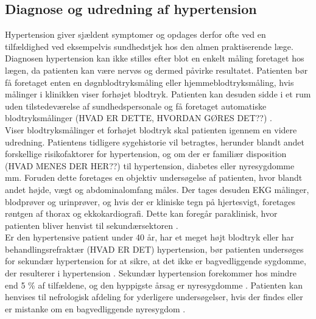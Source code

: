 \subsection{Diagnose og udredning af hypertension}
Hypertension giver sjældent symptomer og opdages derfor ofte ved en tilfældighed ved eksempelvis sundhedstjek hos den almen praktiserende læge. Diagnosen hypertension kan ikke stilles efter blot en enkelt måling foretaget hos lægen, da patienten kan være nervøs og dermed påvirke resultatet. Patienten bør få foretaget enten en døgnblodtryksmåling eller hjemmeblodtryksmåling, hvis målinger i klinikken viser forhøjet blodtryk. Patienten kan desuden sidde i et rum uden tilstedeværelse af sundhedspersonale og få foretaget automatiske blodtryksmålinger (HVAD ER DETTE, HVORDAN GØRES DET??) \citep{lodberg2016, bech2015}. \\
Viser blodtryksmålinger et forhøjet blodtryk skal patienten igennem en videre udredning. Patientens tidligere sygehistorie vil betragtes, herunder blandt andet forskellige risikofaktorer for hypertension, og om der er familiær disposition (HVAD MENES DER HER??) til hypertension, diabetes eller nyresygdomme mm. Foruden dette foretages en objektiv undersøgelse af patienten, hvor blandt andet højde, vægt og abdominalomfang måles. Der tages desuden EKG målinger, blodprøver og urinprøver, og hvis der er kliniske tegn på hjertesvigt, foretages røntgen af thorax og ekkokardiografi. Dette kan foregår paraklinisk, hvor patienten bliver henvist til sekundærsektoren \citep{lodberg2016, bech2015}. \\
Er den hypertensive patient under 40 år, har et meget højt blodtryk eller har behandlingsrefraktær (HVAD ER DET) hypertension, bør patienten undersøges for sekundær hypertension for at sikre, at det ikke er bagvedliggende sygdomme, der resulterer i hypertension \citep{lodberg2016}. Sekundær hypertension forekommer hos mindre end 5 \% af tilfældene, og den hyppigste årsag er nyresygdomme \citep{lodberg2008}. Patienten kan henvises til nefrologisk afdeling for yderligere undersøgelser, hvis der findes eller er mistanke om en bagvedliggende nyresygdom \citep{lodberg2016, sundhedsstyrelsen2010}. 

